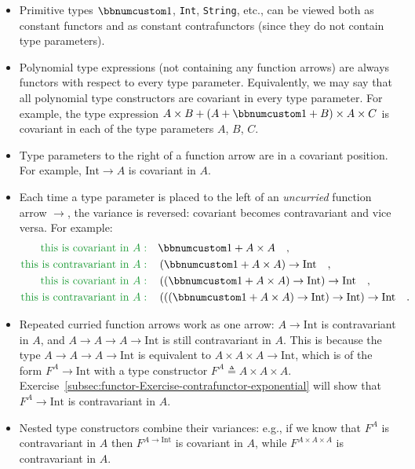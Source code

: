 \begin{itemize}
\item Primitive types $\bbnum 1$, \lstinline!Int!, \lstinline!String!,
etc., can be viewed both as constant functors and as constant contrafunctors
(since they do not contain type parameters).
\item Polynomial type expressions (not containing any function arrows) are
always functors with respect to every type
parameter. Equivalently, we may say that all polynomial type constructors
are covariant in every type parameter. For example, the type expression
$A\times B+\left(A+\bbnum 1+B\right)\times A\times C$ is covariant
in each of the type parameters $A$, $B$, $C$.
\item Type parameters to the right of a function arrow are in a covariant
position. For example, $\text{Int}\rightarrow A$ is covariant in
$A$.
\item Each time a type parameter is placed to the left of an \emph{uncurried}
function arrow $\rightarrow$, the variance is reversed: covariant
becomes contravariant and vice versa. For example:
\begin{align*}
{\color{greenunder}\text{this is covariant in }A:}\quad & \bbnum 1+A\times A\quad,\\
{\color{greenunder}\text{this is contravariant in }A:}\quad & \left(\bbnum 1+A\times A\right)\rightarrow\text{Int}\quad,\\
{\color{greenunder}\text{this is covariant in }A:}\quad & \left(\left(\bbnum 1+A\times A\right)\rightarrow\text{Int}\right)\rightarrow\text{Int}\quad,\\
{\color{greenunder}\text{this is contravariant in }A:}\quad & \left(\left(\left(\bbnum 1+A\times A\right)\rightarrow\text{Int}\right)\rightarrow\text{Int}\right)\rightarrow\text{Int}\quad.
\end{align*}
\item Repeated curried function arrows work as one arrow: $A\rightarrow\text{Int}$
is contravariant in $A$, and $A\rightarrow A\rightarrow A\rightarrow\text{Int}$
is still contravariant in $A$. This is  because the type $A\rightarrow A\rightarrow A\rightarrow\text{Int}$
is equivalent to $A\times A\times A\rightarrow\text{Int}$, which
is of the form $F^{A}\rightarrow\text{Int}$ with a type constructor
$F^{A}\triangleq A\times A\times A$. Exercise~\ref{subsec:functor-Exercise-contrafunctor-exponential}
will show that $F^{A}\rightarrow\text{Int}$ is contravariant in $A$.
\item Nested type constructors combine their variances: e.g., if we know
that $F^{A}$ is contravariant in $A$ then $F^{A\rightarrow\text{Int}}$
is covariant in $A$, while $F^{A\times A\times A}$ is contravariant
in $A$.
\end{itemize}
